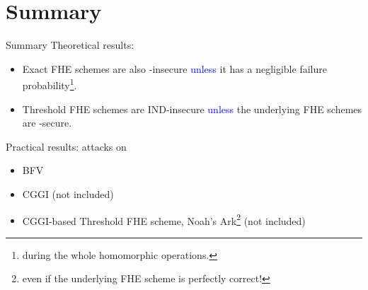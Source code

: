 \documentclass{beamer}
\begin{document}



 

 \section{Summary}
    \begin{frame}{Summary}
    \small
    Theoretical results: 
    \begin{itemize}
        \item Exact FHE schemes are also \indcpad-insecure \textcolor{blue}{unless} it has a negligible failure probability\footnote{during the whole homomorphic operations.}.\pause
        \item Threshold FHE schemes are IND-insecure \textcolor{blue}{unless} the underlying FHE schemes are \indcpad-secure. 
    \end{itemize}\vspace{0.3cm}\pause
    
    Practical results: \krd attacks on
        \begin{itemize}
            \item BFV\pause
            \item CGGI (not included)
            \item CGGI-based Threshold FHE scheme, {Noah's Ark}\footnote{even if the underlying FHE scheme is perfectly correct!} (not included)
        \end{itemize}\vspace{0.5cm}
    \end{frame}
    
\end{document}
